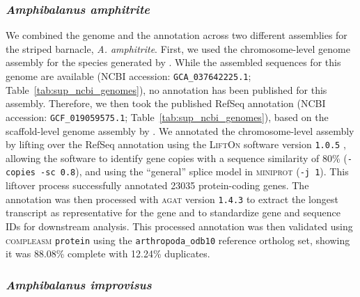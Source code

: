 \subsubsection*{\textit{Amphibalanus amphitrite}}

We combined the genome and the annotation across two different assemblies for the
striped barnacle, \textit{A. amphitrite}.
First, we used the chromosome-level genome assembly for the species generated by
\citet{han_new_2024}.
While the assembled sequences for this genome are available (NCBI accession:
\texttt{GCA\_037642225.1}; Table~\ref{tab:sup_ncbi_genomes}), no annotation has
been published for this assembly.
Therefore, we then took the published RefSeq annotation (NCBI accession:
\texttt{GCF\_019059575.1}; Table~\ref{tab:sup_ncbi_genomes}), based on the
scaffold-level genome assembly by \citet{kim_draft_2019}.
We annotated the chromosome-level assembly by lifting over the RefSeq annotation using
the \textsc{LiftOn} software version \texttt{1.0.5} \citep{chao_lifton_2024},
allowing the software to identify gene copies with a sequence similarity of 80\%
(\texttt{-copies -sc 0.8}), and using the ``general'' splice model in
\textsc{miniprot} (\texttt{-j 1}).
This liftover process successfully annotated \num{23035} protein-coding genes.
The annotation was then processed with \textsc{agat} version \texttt{1.4.3} to
extract the longest transcript as representative for the gene and to standardize gene
and sequence IDs for downstream analysis.
This processed annotation was then validated using \textsc{compleasm} \texttt{protein}
using the \texttt{arthropoda\_odb10} reference ortholog set, showing it was 88.08\%
complete with 12.24\% duplicates.

\subsubsection*{\textit{Amphibalanus improvisus}}

